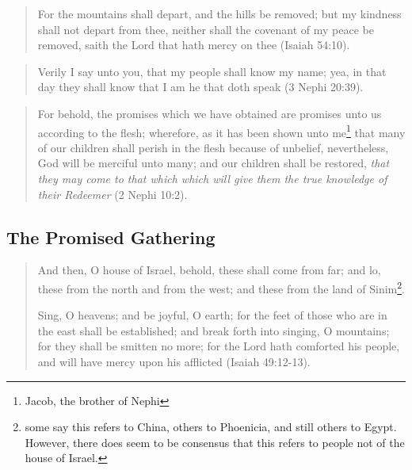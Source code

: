 \begin{quotation}
For the mountains shall depart, and the hills be removed; but my kindness shall not depart from thee, neither shall the covenant of my peace be removed, saith the Lord that hath mercy on thee (Isaiah 54:10).
\end{quotation}

\begin{quotation}
Verily I say unto you, that my people shall know my name; yea, in that day they shall know that I am he that doth speak (3 Nephi 20:39).
\end{quotation}

\begin{quotation}
For behold, the promises which we have obtained are promises unto us according to the flesh; wherefore, as it has been shown unto me\footnote{Jacob, the brother of Nephi} that many of our children shall perish in the flesh because of unbelief, nevertheless, God will be merciful unto many; and our children shall be restored, \textit{that they may come to that which which will give them the true knowledge of their Redeemer} (2 Nephi 10:2).
\end{quotation}

\subsection{The Promised Gathering}

\begin{quotation}
And then, O house of Israel, behold, these shall come from far; and lo, these from the north and from the west; and these from the land of Sinim\footnote{some say this refers to China, others to Phoenicia, and still others to Egypt. However, there does seem to be consensus that this refers to people not of the house of Israel.}.

Sing, O heavens; and be joyful, O earth; for the feet of those who are in the east shall be established; and break forth into singing, O mountains; for they shall be smitten no more; for the Lord hath comforted his people, and will have mercy upon his afflicted (Isaiah 49:12-13).
\end{quotation}

